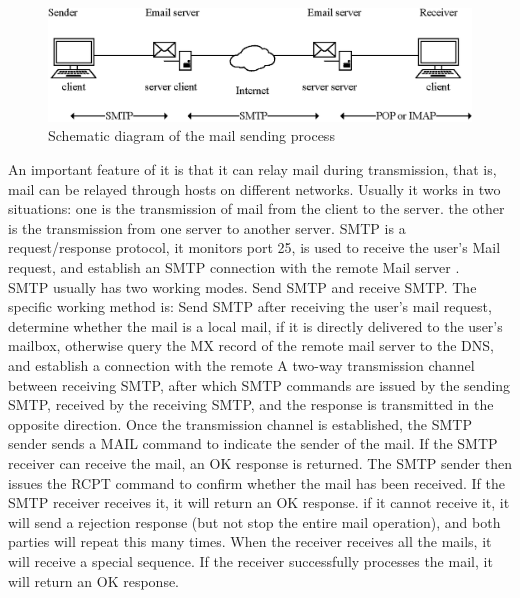 \begin{figure}[!ht]
	\centering
	\includegraphics[width=15cm]{grafiken/2.10.eps}
	\caption{Schematic diagram of the mail sending process} 
	\label{fig:2.10}
\end{figure}
\FloatBarrier

An important feature of it is that it can relay mail during transmission, that is, mail can be relayed through hosts on different networks. Usually it works in two situations: one is the transmission of mail from the client to the server. the other is the transmission from one server to another server. SMTP is a request/response protocol, it monitors port 25, is used to receive the user's Mail request, and establish an SMTP connection with the remote Mail server \cite{sureswaran2009active}.
\\
SMTP usually has two working modes. Send SMTP and receive SMTP. The specific working method is: Send SMTP after receiving the user's mail request, determine whether the mail is a local mail, if it is directly delivered to the user's mailbox, otherwise query the MX record of the remote mail server to the DNS, and establish a connection with the remote A two-way transmission channel between receiving SMTP, after which SMTP commands are issued by the sending SMTP, received by the receiving SMTP, and the response is transmitted in the opposite direction. Once the transmission channel is established, the SMTP sender sends a MAIL command to indicate the sender of the mail. If the SMTP receiver can receive the mail, an OK response is returned. The SMTP sender then issues the RCPT command to confirm whether the mail has been received. If the SMTP receiver receives it, it will return an OK response. if it cannot receive it, it will send a rejection response (but not stop the entire mail operation), and both parties will repeat this many times. When the receiver receives all the mails, it will receive a special sequence. If the receiver successfully processes the mail, it will return an OK response.
\\


